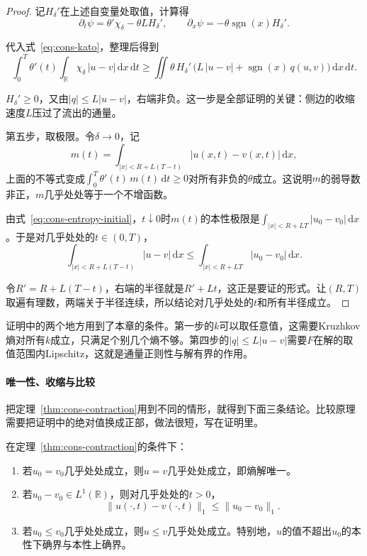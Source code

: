 \begin{proof}
记$H_\delta'$在上述自变量处取值，计算得
\[
  \partial_t\psi=\theta'\chi_\delta-\theta L H_\delta',\qquad
  \partial_x\psi=-\theta\operatorname{sgn}(x)H_\delta' .
\]

代入式~\eqref{eq:cons-kato}，整理后得到
\[
  \int_0^{T}\theta'(t)\int_{\mathbb{R}}\chi_\delta\,\lvert u-v\rvert\,\mathrm{d}x\,\mathrm{d}t
  \geq\iint\theta\,H_\delta'\,\bigl(L\,\lvert u-v\rvert+\operatorname{sgn}(x)\,q(u,v)\bigr)\,\mathrm{d}x\,\mathrm{d}t .
\]

$H_\delta'\geq0$，又由$\lvert q\rvert\leq L\lvert u-v\rvert$，右端非负。这一步是全部证明的关键：侧边的收缩速度$L$压过了流出的通量。

第五步，取极限。令$\delta\to0$，记
\[
  m(t)=\int_{\lvert x\rvert<R+L(T-t)}\lvert u(x,t)-v(x,t)\rvert\,\mathrm{d}x ,
\]
上面的不等式变成$\int_0^T\theta'(t)\,m(t)\,\mathrm{d}t\geq0$对所有非负的$\theta$成立。这说明$m$的弱导数非正，$m$几乎处处等于一个不增函数。

由式~\eqref{eq:cons-entropy-initial}，$t\downarrow0$时$m(t)$的本性极限是$\int_{\lvert x\rvert<R+LT}\lvert u_0-v_0\rvert\,\mathrm{d}x$。于是对几乎处处的$t\in(0,T)$，
\[
  \int_{\lvert x\rvert<R+L(T-t)}\lvert u-v\rvert\,\mathrm{d}x
  \leq\int_{\lvert x\rvert<R+LT}\lvert u_0-v_0\rvert\,\mathrm{d}x .
\]

令$R'=R+L(T-t)$，右端的半径就是$R'+Lt$，这正是要证的形式。让$(R,T)$取遍有理数，两端关于半径连续，所以结论对几乎处处的$t$和所有半径成立。
\end{proof}

证明中的两个地方用到了本章的条件。第一步的$k$可以取任意值，这需要Kruzhkov熵对所有$k$成立，只满足个别几个熵不够。第四步的$\lvert q\rvert\leq L\lvert u-v\rvert$需要$F$在解的取值范围内Lipschitz，这就是通量正则性与解有界的作用。

\paragraph{唯一性、收缩与比较}
把定理~\ref{thm:cons-contraction}用到不同的情形，就得到下面三条结论。比较原理需要把证明中的绝对值换成正部，做法很短，写在证明里。

\begin{theorem}[熵解的唯一性与稳定性]
\label{thm:cons-uniqueness}
在定理~\ref{thm:cons-contraction}的条件下：
\begin{enumerate}
  \item 若$u_0=v_0$几乎处处成立，则$u=v$几乎处处成立，即熵解唯一。
  \item 若$u_0-v_0\in L^1(\mathbb{R})$，则对几乎处处的$t>0$，
  \begin{equation}
    \lVert u(\cdot,t)-v(\cdot,t)\rVert_{1}\leq\lVert u_0-v_0\rVert_{1}.
    \label{eq:cons-l1-contraction}
  \end{equation}
  \item 若$u_0\leq v_0$几乎处处成立，则$u\leq v$几乎处处成立。特别地，$u$的值不超出$u_0$的本性下确界与本性上确界。
\end{enumerate}
\end{theorem}

